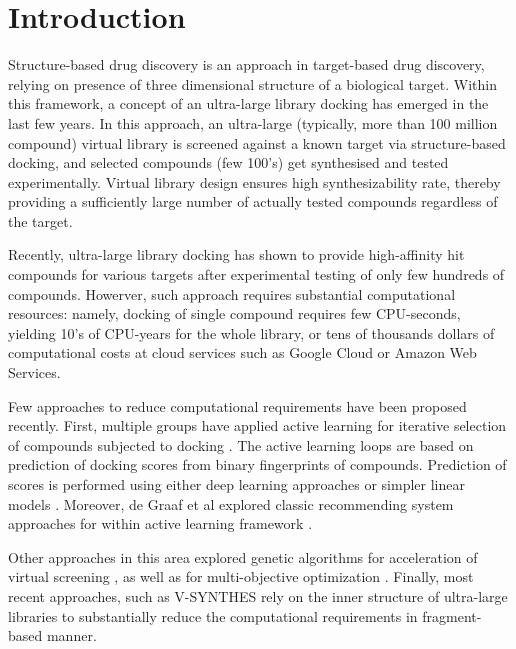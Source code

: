 \section{Introduction}

Structure-based drug discovery is an approach in target-based drug discovery, relying on presence of three dimensional structure of a biological target. Within this framework, a concept of an ultra-large library docking has emerged in the last few years. In this approach, an ultra-large (typically, more than 100 million compound) virtual library is screened against a known target via structure-based docking, and selected compounds (few 100's) get synthesised and tested experimentally. Virtual library design ensures high synthesizability rate, thereby providing a sufficiently large number of actually tested compounds regardless of the target.

Recently, ultra-large library docking has shown to provide high-affinity hit compounds for various targets \cite{sigma2_paper, melatonin_paper, ultralarge_docking_first} after experimental testing of only few hundreds of compounds. Howerver, such approach requires substantial computational resources: namely, docking of single compound requires few CPU-seconds, yielding 10's of CPU-years for the whole library, or tens of thousands dollars of computational costs at cloud services such as Google Cloud or Amazon Web Services.

Few approaches to reduce computational requirements have been proposed recently. First, multiple groups have applied active learning for iterative selection of compounds subjected to docking \cite{Graff2021AcceleratingLearning,autoencoders_guided_learning,logistic_regression,deepdocking,leandocking,Yang2021_shoichet_active_learning}. The active learning loops are based on prediction of docking scores from binary fingerprints of compounds. Prediction of scores is performed using either deep learning approaches \cite{deepdocking,Yang2021_shoichet_active_learning,autoencoders_guided_learning, Graff2021AcceleratingLearning} or simpler linear models \cite{leandocking,logistic_regression}. Moreover, de Graaf et al explored classic recommending system approaches for within active learning framework \cite{Graff2021AcceleratingLearning}. 

Other approaches in this area explored genetic algorithms for acceleration of virtual screening \cite{Jensen2019,Ree2021}, as well as for multi-objective optimization \cite{Steinmann2021}. Finally, most recent approaches, such as V-SYNTHES \cite{Sadybekov2021_vsynthes} rely on the inner structure of ultra-large libraries to substantially reduce the computational requirements in fragment-based manner.

